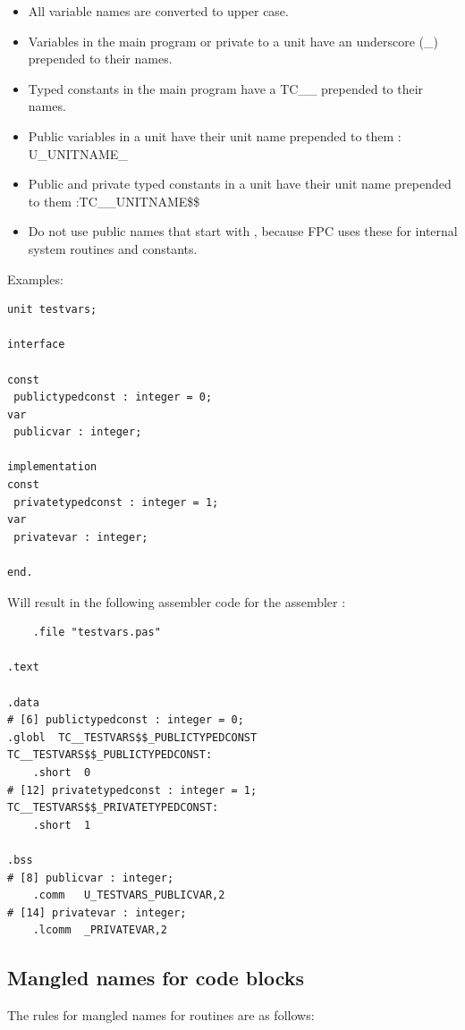 \begin{itemize}
\item All variable names are converted to upper case.
\item Variables in the main program or private to a unit have an underscore
(\_) prepended to their names.
\item Typed constants in the main program have a TC\_\_ prepended to their names.
\item Public variables in a unit have their unit name prepended to them : U\_UNITNAME\_
\item Public and private typed constants in a unit have their unit name prepended to them :TC\_\_UNITNAME\$\$
\item Do not use public names that start with , because FPC uses these for internal system routines and constants.
\end{itemize}
Examples:
\begin{verbatim}
unit testvars;

interface

const
 publictypedconst : integer = 0;
var
 publicvar : integer;

implementation
const
 privatetypedconst : integer = 1;
var
 privatevar : integer;

end.
\end{verbatim}
Will result in the following assembler code for the \gnu assembler :
\begin{verbatim}
	.file "testvars.pas"

.text

.data
# [6] publictypedconst : integer = 0;
.globl	TC__TESTVARS$$_PUBLICTYPEDCONST
TC__TESTVARS$$_PUBLICTYPEDCONST:
	.short	0
# [12] privatetypedconst : integer = 1;
TC__TESTVARS$$_PRIVATETYPEDCONST:
	.short	1

.bss
# [8] publicvar : integer;
	.comm	U_TESTVARS_PUBLICVAR,2
# [14] privatevar : integer;
	.lcomm	_PRIVATEVAR,2
\end{verbatim}


\subsection{Mangled names for code blocks}

The rules for mangled names for routines are as follows:

